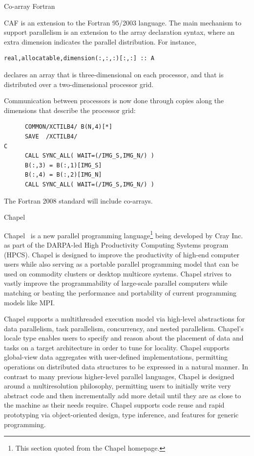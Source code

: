
 {Co-array Fortran}

\acf{CAF} is an extension to the Fortran 95/2003 language.
The main mechanism to support parallelism is an extension to the array
declaration syntax, where an extra dimension indicates the parallel
distribution. For instance,
\begin{verbatim}
real,allocatable,dimension(:,:,:)[:,:] :: A
\end{verbatim}
declares an array that is three-dimensional on each processor, and
that is distributed over a two-dimensional processor grid.

Communication between processors is now done through copies along the
dimensions that describe the processor grid:
\begin{verbatim}
      COMMON/XCTILB4/ B(N,4)[*]
      SAVE  /XCTILB4/
C
      CALL SYNC_ALL( WAIT=(/IMG_S,IMG_N/) )
      B(:,3) = B(:,1)[IMG_S]
      B(:,4) = B(:,2)[IMG_N]
      CALL SYNC_ALL( WAIT=(/IMG_S,IMG_N/) )
\end{verbatim}
The Fortran 2008 standard will include co-arrays.


 {Chapel}
\label{sec:Chapel}

Chapel~\cite{Chapel:homepage} is a new parallel programming
language\footnote{This section quoted from the Chapel homepage.}
being developed by Cray Inc. as part of the DARPA-led High
Productivity Computing Systems program (HPCS). Chapel is designed to
improve the productivity of high-end computer users while also serving
as a portable parallel programming model that can be used on commodity
clusters or desktop multicore systems. Chapel strives to vastly
improve the programmability of large-scale parallel computers while
matching or beating the performance and portability of current
programming models like MPI.

Chapel supports a multithreaded execution model via high-level
abstractions for data parallelism, task parallelism, concurrency, and
nested parallelism. Chapel's locale type enables users to specify and
reason about the placement of data and tasks on a target architecture
in order to tune for locality. Chapel supports global-view data
aggregates with user-defined implementations, permitting operations on
distributed data structures to be expressed in a natural manner. In
contrast to many previous higher-level parallel languages, Chapel is
designed around a multiresolution philosophy, permitting users to
initially write very abstract code and then incrementally add more
detail until they are as close to the machine as their needs
require. Chapel supports code reuse and rapid prototyping via
object-oriented design, type inference, and features for generic
programming.

